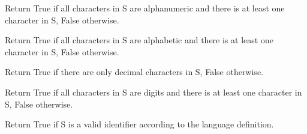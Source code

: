 \documentclass[letterpaper,10pt,english]{sphinxmanual}
\begin{document}
\begin{fulllineitems}
\begin{fulllineitems}
\end{fulllineitems}


\begin{fulllineitems}
\label{api_reference:textblob_de.blob.Word.isalnum}
Return True if all characters in S are alphanumeric
and there is at least one character in S, False otherwise.

\end{fulllineitems}


\begin{fulllineitems}
\label{api_reference:textblob_de.blob.Word.isalpha}
Return True if all characters in S are alphabetic
and there is at least one character in S, False otherwise.

\end{fulllineitems}


\begin{fulllineitems}
\label{api_reference:textblob_de.blob.Word.isdecimal}
Return True if there are only decimal characters in S,
False otherwise.

\end{fulllineitems}


\begin{fulllineitems}
\label{api_reference:textblob_de.blob.Word.isdigit}
Return True if all characters in S are digits
and there is at least one character in S, False otherwise.

\end{fulllineitems}


\begin{fulllineitems}
\label{api_reference:textblob_de.blob.Word.isidentifier}
Return True if S is a valid identifier according
to the language definition.


\end{fulllineitems}
\end{fulllineitems}
\end{document}
